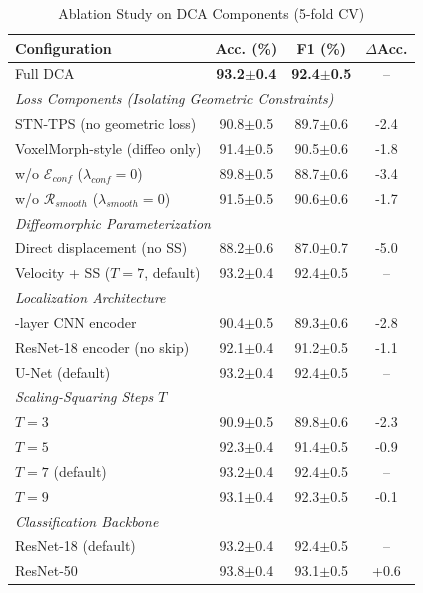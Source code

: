 \begin{table}[t]
\centering
\caption{Ablation Study on DCA Components (5-fold CV)}
\label{tab:ablation}
\begin{tabularx}{\textwidth}{Xccc}
\hline
\textbf{Configuration} & \textbf{Acc. (\%)} & \textbf{F1 (\%)} & \textbf{$\Delta$Acc.} \\
\hline
Full DCA & \textbf{93.2$\pm$0.4} & \textbf{92.4$\pm$0.5} & -- \\
\hline
\multicolumn{4}{l}{\textit{Loss Components (Isolating Geometric Constraints)}} \\
\quad STN-TPS (no geometric loss) & 90.8$\pm$0.5 & 89.7$\pm$0.6 & -2.4 \\
\quad VoxelMorph-style (diffeo only) & 91.4$\pm$0.5 & 90.5$\pm$0.6 & -1.8 \\
\quad w/o $\mathcal{E}_{conf}$ ($\lambda_{conf}=0$) & 89.8$\pm$0.5 & 88.7$\pm$0.6 & -3.4 \\
\quad w/o $\mathcal{R}_{smooth}$ ($\lambda_{smooth}=0$) & 91.5$\pm$0.5 & 90.6$\pm$0.6 & -1.7 \\
\hline
\multicolumn{4}{l}{\textit{Diffeomorphic Parameterization}} \\
\quad Direct displacement (no SS) & 88.2$\pm$0.6 & 87.0$\pm$0.7 & -5.0 \\
\quad Velocity + SS ($T=7$, default) & 93.2$\pm$0.4 & 92.4$\pm$0.5 & -- \\
\hline
\multicolumn{4}{l}{\textit{Localization Architecture}} \\
\quad 3-layer CNN encoder & 90.4$\pm$0.5 & 89.3$\pm$0.6 & -2.8 \\
\quad ResNet-18 encoder (no skip) & 92.1$\pm$0.4 & 91.2$\pm$0.5 & -1.1 \\
\quad U-Net (default) & 93.2$\pm$0.4 & 92.4$\pm$0.5 & -- \\
\hline
\multicolumn{4}{l}{\textit{Scaling-Squaring Steps $T$}} \\
\quad $T=3$ & 90.9$\pm$0.5 & 89.8$\pm$0.6 & -2.3 \\
\quad $T=5$ & 92.3$\pm$0.4 & 91.4$\pm$0.5 & -0.9 \\
\quad $T=7$ (default) & 93.2$\pm$0.4 & 92.4$\pm$0.5 & -- \\
\quad $T=9$ & 93.1$\pm$0.4 & 92.3$\pm$0.5 & -0.1 \\
\hline
\multicolumn{4}{l}{\textit{Classification Backbone}} \\
\quad ResNet-18 (default) & 93.2$\pm$0.4 & 92.4$\pm$0.5 & -- \\
\quad ResNet-50 & 93.8$\pm$0.4 & 93.1$\pm$0.5 & +0.6 \\

\end{tabularx}
\end{table}
